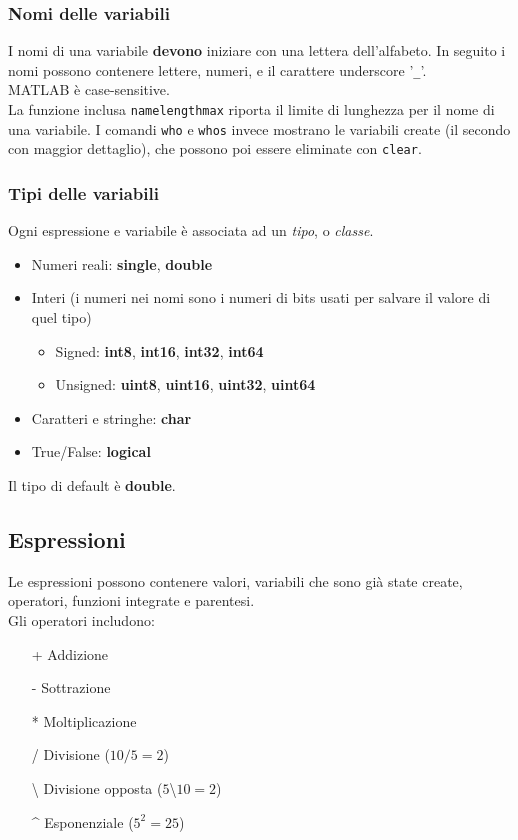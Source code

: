 \documentclass[a4paper, 10pt]{article}
\begin{document}
	\subsubsection{Nomi delle variabili}
	I nomi di una variabile \textbf{devono} iniziare con una lettera dell'alfabeto. In seguito i nomi possono contenere lettere, numeri, e il carattere underscore '\lstinline|_|'.\\
	MATLAB è case-sensitive.\\
	La funzione inclusa \lstinline|namelengthmax| riporta il limite di lunghezza per il nome di una variabile.
	I comandi \lstinline|who| e \lstinline|whos| invece mostrano le variabili create (il secondo con maggior dettaglio), che possono poi essere eliminate con \lstinline|clear|.
	
	\subsubsection{Tipi delle variabili}
	Ogni espressione e variabile è associata ad un \textit{tipo}, o \textit{classe}.
	\begin{itemize}
	\item Numeri reali: \textbf{single}, \textbf{double}
	\item Interi (i numeri nei nomi sono i numeri di bits usati per salvare il valore di quel tipo)
		\begin{itemize}
		\item Signed: \textbf{int8}, \textbf{int16}, \textbf{int32}, \textbf{int64}
		\item Unsigned: \textbf{uint8}, \textbf{uint16}, \textbf{uint32}, \textbf{uint64}
		\end{itemize}
	\item Caratteri e stringhe: \textbf{char}
	\item True/False: \textbf{logical}
	\end{itemize}
	Il tipo di default è \textbf{double}.
	
	\subsection{Espressioni}
	Le espressioni possono contenere valori, variabili che sono già state create, operatori, funzioni integrate e parentesi. \\
	Gli operatori includono:
	\begin{itemize}
	\item[+] Addizione
	\item[-] Sottrazione
	\item[*] Moltiplicazione
	\item[/] Divisione ($10/5=2$)
	\item[\textbackslash] Divisione opposta ($5$\textbackslash$10=2$)
	\item[\textasciicircum] Esponenziale ($5^2=25$)
	\end{itemize}
	
\end{document}
